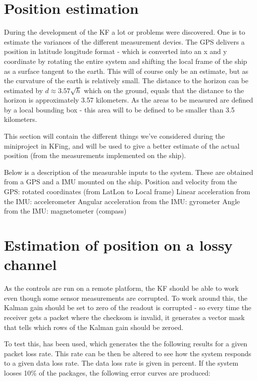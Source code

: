 \section{Position estimation}
During the development of the \ac{KF} a lot or problems were discovered. One is to estimate the variances of the different measurement devies. The GPS delivers a position in latitude longitude format - which is converted into an x and y coordinate by rotating the entire system and shifting the local frame of the ship as a surface tangent to the earth. This will of course only be an estimate, but as the curvature of the earth is relatively small. The distance to the horizon can be estimated by $d \approx 3.57\sqrt{h}$ which on the ground, equals that the distance to the horizon is approximately 3.57 kilometers. As the areas to be measured are defined by a local bounding box - this area will to be defined to be smaller than 3.5 kilometers.

This section will contain the different things we've considered during the miniproject in \ac{KF}ing, and will be used to give a better estimate of the actual position (from the measurements implemented on the ship).

Below is a description of the measurable inputs to the system. These are obtained from a \ac{GPS} and a \ac{IMU} mounted on the ship.
Position and velocity from the \ac{GPS}: rotated coordinates (from LatLon to Local frame)
Linear acceleration from the \ac{IMU}: accelerometer
Angular acceleration from the \ac{IMU}: gyrometer
Angle from the \ac{IMU}: magnetometer (compass)

\section{Estimation of position on a lossy channel}
As the controls are run on a remote platform, the \ac{KF} should be able to work even though some sensor measurements are corrupted. To work around this, the Kalman gain should be set to zero of the readout is corrupted - so every time the receiver gets a packet where the checksom is invalid, it generates a vector mask that tells which rows of the Kalman gain should be zeroed. 

To test this, \MATLAB has been used, which generates the the following results for a given packet loss rate. This rate can be then be altered to see how the system responds to a given data loss rate. The data loss rate is given in percent. If the system looses 10\% of the packages, the following error curves are produced:
